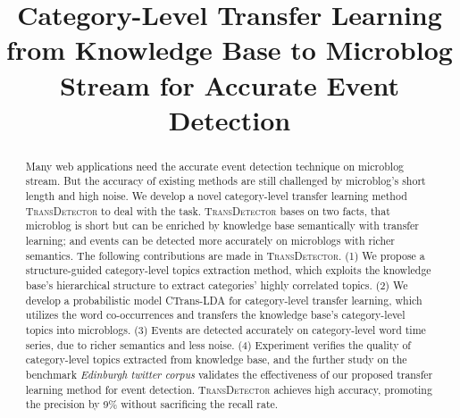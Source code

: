 \documentclass[runningheads,a4paper]{llncs}
\theoremstyle{exampstyle}
\begin{document}
%
\title{Category-Level Transfer Learning from Knowledge Base to Microblog Stream for Accurate Event Detection}
\titlerunning{\ }

\maketitle

\begin{abstract}
Many web applications need the accurate event detection technique on microblog stream. 
But the accuracy of existing methods are still challenged by microblog's short length and high noise. 
We develop a novel category-level transfer learning method \textsc{TransDetector} to deal with the task.  
\textsc{TransDetector} bases on two facts, that microblog is short but can be enriched by knowledge base semantically with transfer learning; and events can be detected more accurately on microblogs with richer semantics.
The following contributions are made in \textsc{TransDetector}.
(1) We propose a structure-guided category-level topics extraction method, which exploits the knowledge base's hierarchical structure to extract categories' highly correlated topics. 
(2) We develop a probabilistic model CTrans-LDA for category-level transfer learning, which utilizes the word co-occurrences and transfers the knowledge base's category-level topics into microblogs. 
(3) Events are detected accurately on category-level word time series, due to richer semantics and less noise. 
(4) Experiment verifies the quality of category-level topics extracted from knowledge base, and the further study on the benchmark \textit{Edinburgh twitter corpus} validates the effectiveness of our proposed transfer learning method for event detection.
\textsc{TransDetector} achieves high accuracy, promoting the precision by 9\% without  sacrificing the recall rate.

\end{abstract}
\end{document}
